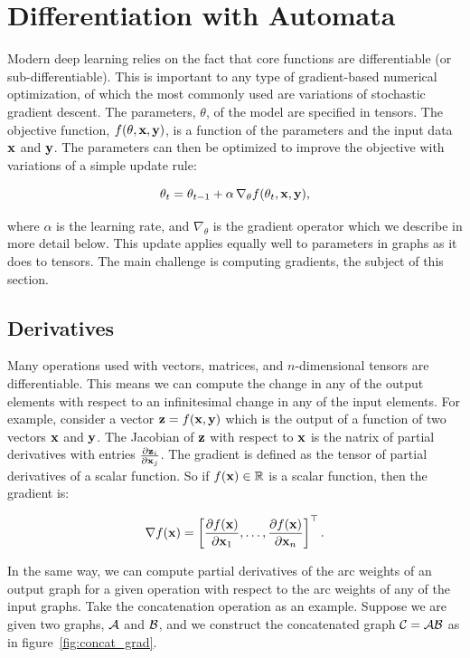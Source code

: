 \section{Differentiation with Automata}
\label{sec:differentiation_with_automata}

Modern deep learning relies on the fact that core functions are differentiable
(or sub-differentiable). This is important to any type of gradient-based
numerical optimization, of which the most commonly used are variations of
stochastic gradient descent. The parameters, $\theta$, of the model are
specified in tensors. The objective function, $f(\theta, {\bf x}, {\bf y})$, is a
function of the parameters and the input data ${\bf x}$ and ${\bf y}$. The parameters
can then be optimized to improve the objective with variations of a simple
update rule:

$$
\theta_t = \theta_{t-1} + \alpha \, \nabla_{\theta} f(\theta_t, {\bf x}, {\bf y}),
$$

where $\alpha$ is the learning rate, and $\nabla_{\theta}$ is the gradient
operator which we describe in more detail below. This update applies equally
well to parameters in graphs as it does to tensors. The main challenge is
computing gradients, the subject of this section.


\subsection{Derivatives}

Many operations used with vectors, matrices, and $n$-dimensional tensors are
differentiable. This means we can compute the change in any of the output
elements with respect to an infinitesimal change in any of the input elements.
For example, consider a vector ${\bf z} = f({\bf x}, {\bf y})$ which is the output of a
function of two vectors ${\bf x}$ and ${\bf y}$. The Jacobian of ${\bf z}$ with respect to
${\bf x}$ is the  natrix of partial derivatives with entries $\frac{\partial
{\bf z}_i}{\partial {\bf x}_j}$. The gradient is defined as the tensor of partial
derivatives of a scalar function. So if $f({\bf x}) \in \mathbb{R}$ is a scalar
function, then the gradient is:

$$
\nabla f({\bf x}) = \left[ \frac{\partial f({\bf x})}{\partial {\bf x}_{1}}, \ldots,
    \frac{\partial f({\bf x})}{\partial {\bf x}_{n}}  \right]^\top.
$$

In the same way, we can compute partial derivatives of the arc weights of an
output graph for a given operation with respect to the arc weights of any of
the input graphs. Take the concatenation operation as an example. Suppose we
are given two graphs, $\mathcal{A}$ and $\mathcal{B}$, and we construct the concatenated graph
$\mathcal{C} = \mathcal{A} \mathcal{B}$ as in figure~\ref{fig:concat_grad}.

